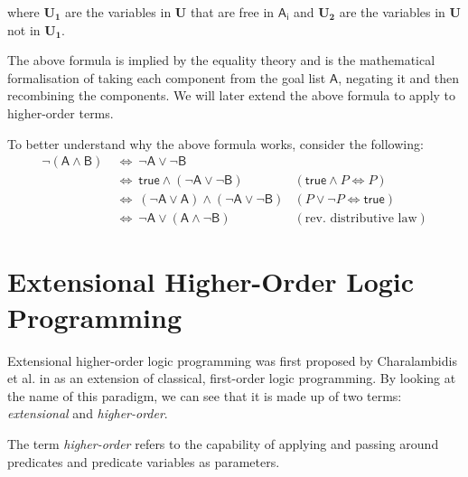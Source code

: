 \documentclass[inscr,ack,preface]{dithesis}
\theoremstyle{definition}
\newcommand{\msf}[1]{$\mathsf{#1}$}
\begin{document}
where \msf{\textbf{U}_\textbf{1}} are the variables in \msf{\textbf{U}} that are free in \msf{A_i} and \msf{\textbf{U}_\textbf{2}} are the variables in \msf{\textbf{U}} not in \msf{\textbf{U}_\textbf{1}}.

The above formula is implied by the equality theory and is the mathematical formalisation of taking each component from the goal list \msf{A}, negating it and then recombining the components. We will later extend the above formula to apply to higher-order terms.

To better understand why the above formula works, consider the following:
\begin{align*}
  \mathsf{\lnot \left( A \land B \right)} & ~\Leftrightarrow~ \mathsf{\lnot A \lor \lnot B} & ~ \\
                                          & ~\Leftrightarrow~ \mathsf{true \land \left( \lnot A \lor \lnot B \right)} & \left( \mathsf{true} \land P \Leftrightarrow P \right) \\
                                          & ~\Leftrightarrow~ \mathsf{\left( \lnot A \lor A \right) \land \left( \lnot A \lor \lnot B \right)} & \left( P \lor \lnot P \Leftrightarrow \mathsf{true} \right) \\
                                          & ~\Leftrightarrow~ \mathsf{\lnot A \lor \left( A \land \lnot B \right)} & (\text{rev. distributive law})
\end{align*}


\section{Extensional Higher-Order Logic Programming}
Extensional higher-order logic programming was first proposed by Charalambidis et al. in \cite{DBLP:journals/tocl/CharalambidisHRW13} as an extension of classical, first-order logic programming. By looking at the name of this paradigm, we can see that it is made up of two terms: \emph{extensional} and \emph{higher-order}.

The term \emph{higher-order} refers to the capability of applying and passing around predicates and predicate variables as parameters.
\end{document}
